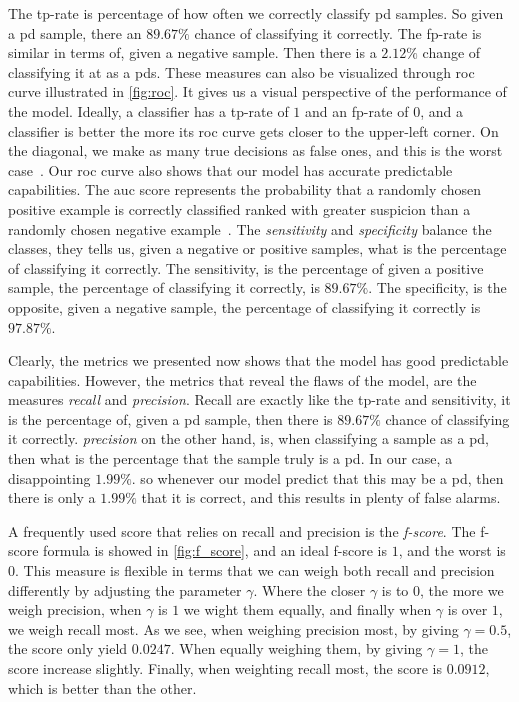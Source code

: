 The tp-rate is percentage of how often we correctly classify \ac{pd} samples. So given a \ac{pd} sample, there an $89.67\%$ chance of classifying it correctly. The fp-rate is similar in terms of, given a negative sample. Then there is a $2.12\%$ change of classifying it at as a \acp{pd}. These measures can also be visualized through \ac{roc} curve illustrated in \autoref{fig:roc}. It gives us a visual perspective of the performance of the model. Ideally, a classifier has a tp-rate of $1$ and an fp-rate of $0$, and a classifier is better the more its \ac{roc} curve gets closer to the upper-left corner. On the diagonal, we make as many true decisions as false ones, and this is the worst case~\cite[p.~563]{alpaydin2014introduction}. Our \ac{roc} curve also shows that our model has accurate predictable capabilities. The \ac{auc} score represents the probability that a randomly chosen positive example is correctly classified ranked with greater suspicion than a randomly chosen negative example~\cite{bradley1997use}.
The \emph{sensitivity} and \emph{specificity} balance the classes, they tells us, given a negative or positive samples, what is the percentage of classifying it correctly. The sensitivity, is the percentage of given a positive sample, the percentage of classifying it correctly, is $89.67\%$. The specificity, is the opposite, given a negative sample, the percentage of classifying it correctly is $97.87\%$. 

Clearly, the metrics we presented now shows that the model has good predictable capabilities. However, the metrics that reveal the flaws of the model, are the measures \emph{recall} and \emph{precision}. Recall are exactly like the tp-rate and sensitivity, it is the percentage of, given a \ac{pd} sample, then there is $89.67\%$ chance of classifying it correctly. \emph{precision} on the other hand, is, when classifying a sample as a \ac{pd}, then what is the percentage that the sample truly is a \ac{pd}. In our case, a disappointing $1.99\%$. so whenever our model predict that this may be a \ac{pd}, then there is only a $1.99\%$ that it is correct, and this results in plenty of false alarms. 



A frequently used score that relies on recall and precision is the \emph{f-score}. The f-score formula is showed in \autoref{fig:f_score}, and an ideal f-score is $1$, and the worst is $0$. This measure is flexible in terms that we can weigh both recall and precision differently by adjusting the parameter $\gamma$. Where the closer $\gamma$ is to $0$, the more we weigh precision, when $\gamma$ is $1$ we wight them equally, and finally when $\gamma$ is over $1$, we weigh recall most. As we see, when weighing precision most, by giving  $\gamma=0.5$, the score only yield $0.0247$. When equally weighing them, by giving $\gamma=1$, the score increase slightly. Finally, when weighting recall most, the score is $0.0912$, which is better than the other.

